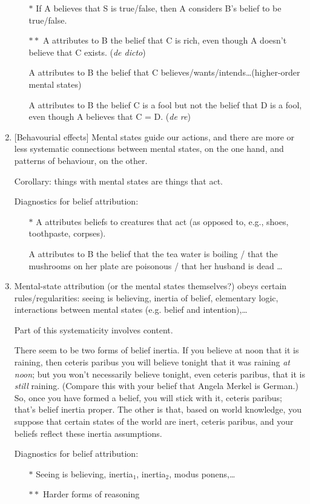 \documentclass[12pt,a4paper]{article}
\newcommand{\E}[1]{\emph{#1}}
\begin{document}
\begin{enumerate}[label=P$_{\!\arabic*}$]
\begin{itemize}\itemsep=0ex
\item[$\ast$] If A believes that S is true/false, then A considers B's belief to be true/false. \par %
\item[$\ast\ast$] A attributes to B the belief that C is rich, even though  A doesn't believe that C exists. (\E{de dicto}) \par A attributes to B the belief that C believes/wants/intends\ldots (higher-order mental states)
\par A attributes to B the belief C is a fool but not the belief that D is a fool, even though A believes that C = D. (\E{de re})
\end{itemize}

\item \label{p:effects} [Behavourial effects] Mental states guide our actions, and there are more or less systematic connections between mental states, on the one hand, and patterns of behaviour, on the other. 
\par Corollary: things with mental states are things that act.
\par Diagnostics for belief attribution:
\begin{itemize}\itemsep=0ex
\item[$\ast$] A attributes beliefs to creatures that act (as opposed to, e.g., shoes, toothpaste, corpses). \par A attributes to B the belief that the tea water is boiling / that the mushrooms on her plate are poisonous / that her husband is dead \ldots
\end{itemize}

\item \label{p:causes} Mental-state attribution (or the mental states themselves?) obeys certain rules/regularities: seeing is believing, inertia of belief, elementary logic, interactions between mental states (e.g. belief and intention),\ldots
\par Part of this systematicity involves content.
\par There seem to be two forms of belief inertia. If you believe at noon that it is raining, then ceteris paribus you will believe tonight that it was raining \E{at noon}; but you won't necessarily believe tonight, even ceteris paribus, that it is \E{still} raining. (Compare this with your belief that Angela Merkel is German.) So, once you have formed a belief, you will stick with it, ceteris paribus; that's belief inertia proper. The other is that, based on world knowledge, you suppose that certain states of the world are inert, ceteris paribus, and your beliefs reflect these inertia assumptions. 
\par Diagnostics for belief attribution:
\begin{itemize}\itemsep=0ex
\item[$\ast$] Seeing is believing, inertia$_1$, inertia$_2$, modus ponens,\ldots
\item[$\ast\ast$] Harder forms of reasoning
\end{itemize}


\end{enumerate}
\end{document}
